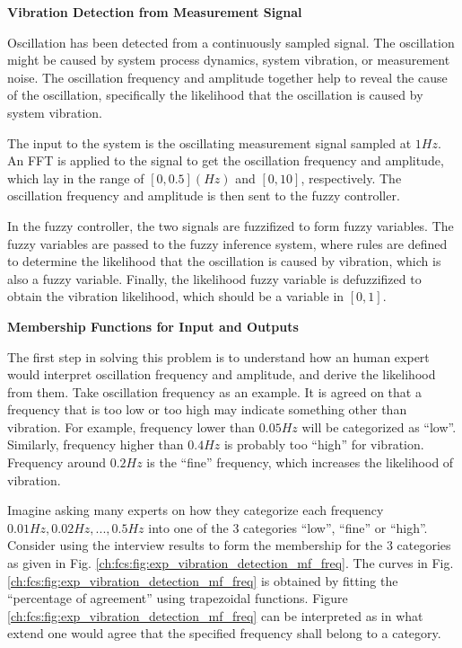 \begin{mdframed}
\noindent \textbf{Vibration Detection from Measurement Signal}

Oscillation has been detected from a continuously sampled signal. The oscillation might be caused by system process dynamics, system vibration, or measurement noise. The oscillation frequency and amplitude together help to reveal the cause of the oscillation, specifically the likelihood that the oscillation is caused by system vibration.

The input to the system is the oscillating measurement signal sampled at $1Hz$. An FFT is applied to the signal to get the oscillation frequency and amplitude, which lay in the range of $[0, 0.5] (Hz)$ and $[0, 10]$, respectively. The oscillation frequency and amplitude is then sent to the fuzzy controller.

In the fuzzy controller, the two signals are fuzzifized to form fuzzy variables. The fuzzy variables are passed to the fuzzy inference system, where rules are defined to determine the likelihood that the oscillation is caused by vibration, which is also a fuzzy variable. Finally, the likelihood fuzzy variable is defuzzifized to obtain the vibration likelihood, which should be a variable in $[0,1]$.

\end{mdframed}

\vspace{0.1in}
\noindent \textbf{Membership Functions for Input and Outputs}
\vspace{0.1in}

The first step in solving this problem is to understand how an human expert would interpret oscillation frequency and amplitude, and derive the likelihood from them. Take oscillation frequency as an example. It is agreed on that a frequency that is too low or too high may indicate something other than vibration. For example, frequency lower than $0.05Hz$ will be categorized as ``low''. Similarly, frequency higher than $0.4Hz$ is probably too ``high'' for vibration. Frequency around $0.2Hz$ is the ``fine'' frequency, which increases the likelihood of vibration.

Imagine asking many experts on how they categorize each frequency $0.01Hz, 0.02Hz, ..., 0.5Hz$ into one of the 3 categories ``low'', ``fine'' or ``high''. Consider using the interview results to form the membership for the 3 categories as given in Fig. \ref{ch:fcs:fig:exp_vibration_detection_mf_freq}. The curves in Fig. \ref{ch:fcs:fig:exp_vibration_detection_mf_freq} is obtained by fitting the ``percentage of agreement'' using trapezoidal functions. Figure \ref{ch:fcs:fig:exp_vibration_detection_mf_freq} can be interpreted as in what extend one would agree that the specified frequency shall belong to a category.

